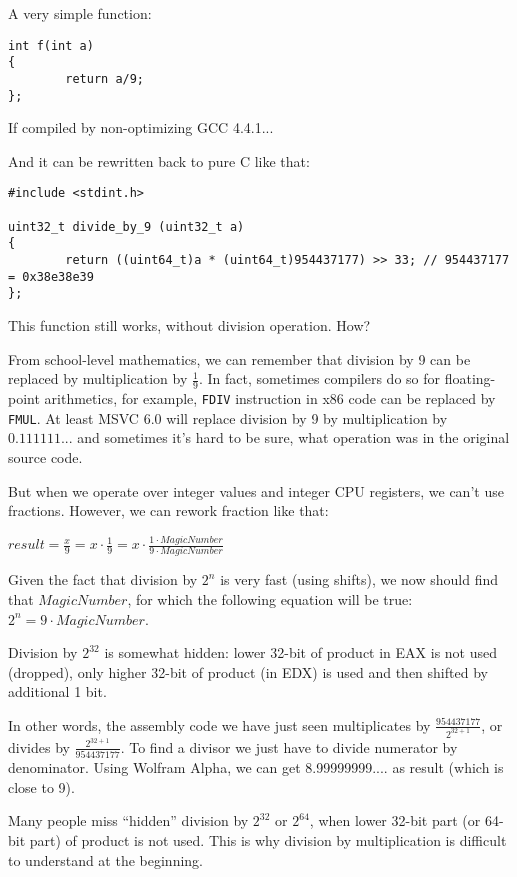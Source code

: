 
A very simple function:

\begin{lstlisting}
int f(int a)
{
        return a/9;
};
\end{lstlisting}

If compiled by non-optimizing GCC 4.4.1...



And it can be rewritten back to pure C like that:

\begin{lstlisting}[style=customc]
#include <stdint.h>

uint32_t divide_by_9 (uint32_t a)
{
        return ((uint64_t)a * (uint64_t)954437177) >> 33; // 954437177 = 0x38e38e39
};
\end{lstlisting}

This function still works, without division operation. How?

From school-level mathematics, we can remember that division by 9 can be replaced by multiplication by $\frac{1}{9}$.
In fact, sometimes compilers do so for floating-point arithmetics, for example, \texttt{FDIV} instruction in x86 code
can be replaced by \texttt{FMUL}.
At least MSVC 6.0 will replace division by 9 by multiplication by $0.111111...$ and sometimes it's hard to be sure,
what operation was in the original source code.

But when we operate over integer values and integer CPU registers, we can't use fractions.
However, we can rework fraction like that:

\begin{center}
$result = \frac{x}{9} = x \cdot \frac{1}{9} = x \cdot \frac{1 \cdot MagicNumber}{9 \cdot MagicNumber}$
\end{center}

Given the fact that division by $2^n$ is very fast (using shifts), we now should find that $MagicNumber$,
for which the following
equation will be true: $2^n = 9 \cdot MagicNumber$.

Division by $2^{32}$ is somewhat hidden: lower 32-bit of product in EAX is not used (dropped), only higher 32-bit of
product (in EDX) is used and then shifted by additional 1 bit.

In other words, the assembly code we have just seen multiplicates by {\Large $\frac{954437177}{2^{32+1}}$},
or divides by {\Large $\frac{2^{32+1}}{954437177}$}.
To find a divisor we just have to divide numerator by denominator.
Using Wolfram Alpha, we can get 8.99999999.... as result (which is close to 9).



Many people miss ``hidden'' division by $2^{32}$ or $2^{64}$,
when lower 32-bit part (or 64-bit part) of product is not used.
This is why division by multiplication is difficult to understand at the beginning.

